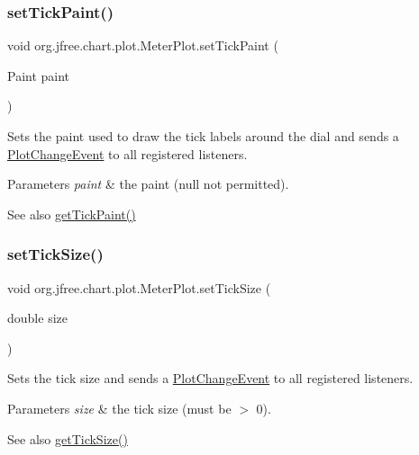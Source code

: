 \subsubsection{\texorpdfstring{set\+Tick\+Paint()}{setTickPaint()}}
{\footnotesize\ttfamily void org.\+jfree.\+chart.\+plot.\+Meter\+Plot.\+set\+Tick\+Paint (\begin{DoxyParamCaption}\item[{Paint}]{paint }\end{DoxyParamCaption})}

Sets the paint used to draw the tick labels around the dial and sends a \mbox{\hyperlink{}{Plot\+Change\+Event}} to all registered listeners.


\begin{DoxyParams}{Parameters}
{\em paint} & the paint ({\ttfamily null} not permitted).\\
\hline
\end{DoxyParams}
\begin{DoxySeeAlso}{See also}
\mbox{\hyperlink{classorg_1_1jfree_1_1chart_1_1plot_1_1_meter_plot_a3db1e7fc277e356f202e2f4ce5730c12}{get\+Tick\+Paint()}} 
\end{DoxySeeAlso}
\mbox{\label{classorg_1_1jfree_1_1chart_1_1plot_1_1_meter_plot_a98f1e32669767d46e910c12afa1236ac}} 
\subsubsection{\texorpdfstring{set\+Tick\+Size()}{setTickSize()}}
{\footnotesize\ttfamily void org.\+jfree.\+chart.\+plot.\+Meter\+Plot.\+set\+Tick\+Size (\begin{DoxyParamCaption}\item[{double}]{size }\end{DoxyParamCaption})}

Sets the tick size and sends a \mbox{\hyperlink{}{Plot\+Change\+Event}} to all registered listeners.


\begin{DoxyParams}{Parameters}
{\em size} & the tick size (must be $>$ 0).\\
\hline
\end{DoxyParams}
\begin{DoxySeeAlso}{See also}
\mbox{\hyperlink{classorg_1_1jfree_1_1chart_1_1plot_1_1_meter_plot_a14d55a550f52b6faba78c7cfd2d84683}{get\+Tick\+Size()}} 
\end{DoxySeeAlso}
\mbox{\label{classorg_1_1jfree_1_1chart_1_1plot_1_1_meter_plot_acb00315501970dbaaab783969c621103}} 
